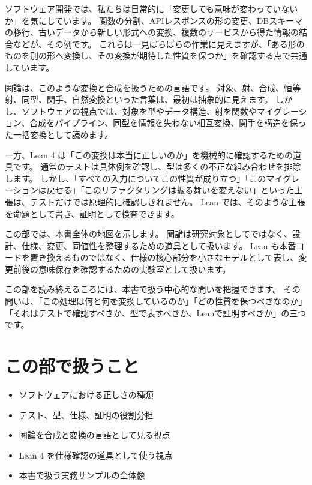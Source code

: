 ソフトウェア開発では、私たちは日常的に「変更しても意味が変わっていないか」を気にしています。
関数の分割、APIレスポンスの形の変更、DBスキーマの移行、古いデータから新しい形式への変換、複数のサービスから得た情報の結合などが、その例です。
これらは一見ばらばらの作業に見えますが、「ある形のものを別の形へ変換し、その変換が期待した性質を保つか」を確認する点で共通しています。

圏論は、このような変換と合成を扱うための言語です。
対象、射、合成、恒等射、同型、関手、自然変換といった言葉は、最初は抽象的に見えます。
しかし、ソフトウェアの視点では、対象を型やデータ構造、射を関数やマイグレーション、合成をパイプライン、同型を情報を失わない相互変換、関手を構造を保った一括変換として読めます。

一方、Lean 4 は「この変換は本当に正しいのか」を機械的に確認するための道具です。
通常のテストは具体例を確認し、型は多くの不正な組み合わせを排除します。
しかし、「すべての入力についてこの性質が成り立つ」「このマイグレーションは戻せる」「このリファクタリングは振る舞いを変えない」といった主張は、テストだけでは原理的に確認しきれません。
Lean では、そのような主張を命題として書き、証明として検査できます。

この部では、本書全体の地図を示します。
圏論は研究対象としてではなく、設計、仕様、変更、同値性を整理するための道具として扱います。
Lean も本番コードを置き換えるものではなく、仕様の核心部分を小さなモデルとして表し、変更前後の意味保存を確認するための実験室として扱います。

この部を読み終えるころには、本書で扱う中心的な問いを把握できます。
その問いは、「この処理は何と何を変換しているのか」「どの性質を保つべきなのか」「それはテストで確認すべきか、型で表すべきか、Leanで証明すべきか」の三つです。

\section*{この部で扱うこと}

\begin{itemize}
\item ソフトウェアにおける正しさの種類
\item テスト、型、仕様、証明の役割分担
\item 圏論を合成と変換の言語として見る視点
\item Lean 4 を仕様確認の道具として使う視点
\item 本書で扱う実務サンプルの全体像
\end{itemize}
